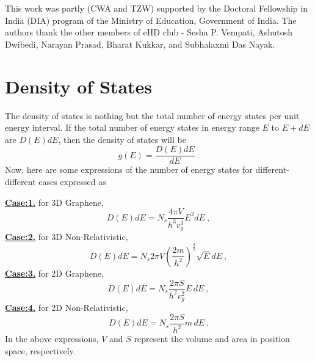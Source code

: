 \documentclass[amsmath,amssymb,aps,prb]{revtex4-2}
\begin{document}
    \begin{acknowledgments}
    This work was partly (CWA and TZW) supported by the Doctoral Fellowship in India (DIA) program of the Ministry of Education, Government of India. The authors thank the other members of eHD club - Sesha P. Vempati, Ashutosh Dwibedi, Narayan Prasad, Bharat Kukkar, and Subhalaxmi Das Nayak.
    \end{acknowledgments} 
%
    \appendix
    \section{Density of States}
    \label{App_A}
    The density of states is nothing but the total number of energy states per unit energy interval. If the total number of energy states in energy range $E$ to $E + dE$ are $D\left(E\right)dE$, then the density of states will be 
    \begin{equation}
    g\left(E\right) = \frac{D\left(E\right)dE}{dE}~.
    \end{equation}
    Now, here are some expressions of the number of energy states for different-different cases expressed as

    \hfill \break
    \textbf{\underline{Case:1.}} for 3D Graphene,
    \begin{equation}
    D\left(E\right)dE = N_s \frac{4\pi V}{h^3 v_g^3}E^2 dE~,
    \end{equation}
    \textbf{\underline{Case:2.}} for 3D Non-Relativistic,
    \begin{equation}
     D\left(E\right)dE = N_s 2\pi V \left(\frac{2m}{h^2}\right)^{\frac{3}{2}}\sqrt{E} dE~,
    \end{equation}
    \textbf{\underline{Case:3.}} for 2D Graphene,
    \begin{equation}
    D\left(E\right)dE = N_s \frac{2\pi S}{h^2 v_g^2} E \, dE~,
    \end{equation}
    \textbf{\underline{Case:4.}} for 2D Non-Relativistic,
    \begin{equation}
     D\left(E\right)dE = N_s \frac{2\pi S}{h^2} m\, dE~.
    \end{equation}
    In the above expressions, $V$ and $S$ represent the volume and area in position space, respectively.
\end{document}
